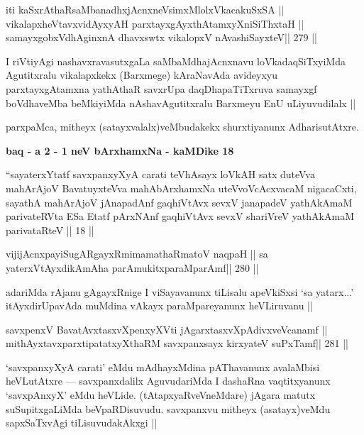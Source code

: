 \begin{shl}
iti kaSxrAthaRsaMbanadhxjAcnxneV\s simxMlolxVkacakuSxSA ||
vikalapxheVtavxvidAyxyAH parxtayxgAyxthAtamxyXniSiThxtaH ||
samayxgobxVdhAginxnA dhavxswtx vikalopxV nAvashiSayxteV\hfill || 279 ||
\end{shl}

\begin{artha}
I riVtiyAgi nashavxravasutxgaLa saMbaMdhajAcnxnavu loVkadaqSiTxyiMda Agutitxralu vikalapxkekx (Barxmege) kAraNavAda avideyxyu parxtayxgAtamxna yathAthaR savxrUpa daqDhapaTiTxruva samayxgf boVdhaveMba beMkiyiMda nAshavAgutitxralu Barxmeyu EnU uLiyuvudilalx ||
\end{artha}

\begin{artha}
parxpaMca, mitheyx (satayxvalalx)veMbudakekx shurxtiyanunx AdharisutAtxre.
\end{artha}


\begin{center}
{\large\bf baq - a 2 - 1 neV bArxhamxNa  - kaMDike 18}
\end{center}

\begin{shl}
``sayaterxYtatf savxpanxyXyA carati teVhAsayx loVkAH
satx duteVva mahArAjoV BavatuyxteVva mahAbArxhamxNa
uteVvoVcAcxvacaM nigacaCxti, sayathA mahArAjoV
jAnapadAnf gaqhiVtAvx sevxV janapadeV yathAkAmaM
parivateRVta ESa Etatf pArxNAnf gaqhiVtAvx sevxV
shariVreV yathAkAmaM parivataRteV || 18 ||
\end{shl}

\begin{shl}
vijijAcnxpayiSugARgayxRmimamathaRmatoV naqpaH ||
sa yaterxVtAyxdikAmAha parAmukitxparaMparAmf\hfill || 280 ||
\end{shl}

\begin{artha}
adariMda rAjanu gAgayxRnige I viSayavanunx tiLisalu apeVkiSxsi `sa 
yatarx...' itAyxdirUpavAda muMdina vAkayx paraMpareyanunx heVLiruvanu ||
\end{artha}

\begin{shl}
savxpenxV BavatAvxtasxvXpenxyXVti jAgarxtasxvXpAdivxveVcanamf ||
mithAyxtavxparxtipatatxyXthaRM savxpanxsayx kirxyateV suPxTamf\hfill || 281 ||
\end{shl}

\begin{artha}
`savxpanxyXyA carati' eMdu mAdhayxMdina pAThavanunx avalaMbisi 
heVLutAtxre --- savxpanxdalilx AguvudariMda I dashaRna vaqtitxyanunx 
`savxpAnxyX' eMdu heVLide. (tAtapxyaRveVneMdare) jAgara matutx suSupitxgaLiMda beVpaRDisuvudu. savxpanxvu mitheyx (asatayx)veMdu sapxSaTxvAgi tiLisuvudakAkxgi ||
\end{artha}

